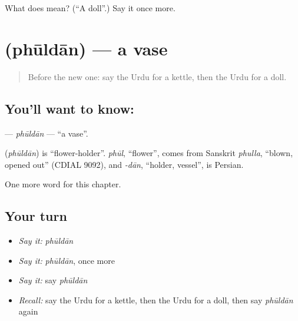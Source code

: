 \begin{tcolorbox}[breakable,colback=teal!4,colframe=teal!35!black,title={Before you move on}]
What does  mean? (\textquotedblleft{}A doll\textquotedblright{}.) Say it once more.
\end{tcolorbox}
\section[\texorpdfstring{\ur{پھولدان} (phūldān)}{پھولدان (phūldān)}]{ (phūldān) — a vase}

\label{lesson:UR-C251-phuldan}



\begin{quote}
Before the new one: say the Urdu for a kettle, then the Urdu for a doll.
\end{quote}

\subsection*{You'll want to know: }
\textbf{} — \emph{phūldān} — \textquotedblleft{}a vase\textquotedblright{}.

\begin{cousinweb}
\textbf{} (\emph{phūldān}) is \textquotedblleft{}flower-holder\textquotedblright{}. \emph{phūl}, \textquotedblleft{}flower\textquotedblright{}, comes from Sanskrit \emph{phulla}, \textquotedblleft{}blown, opened out\textquotedblright{} (CDIAL 9092), and \emph{-dān}, \textquotedblleft{}holder, vessel\textquotedblright{}, is Persian.
\end{cousinweb}

\begin{grammarlens}[title={What you've built}]
One more word for this chapter.
\end{grammarlens}

\subsection*{Your turn}
\begin{itemize}
\raggedright
  \item \emph{Say it:} \emph{phūldān}
  \item \emph{Say it:} \emph{phūldān}, once more
  \item \emph{Say it:} say \emph{phūldān}
  \item \emph{Recall:} say the Urdu for a kettle, then the Urdu for a doll, then say \emph{phūldān} again
\end{itemize}

